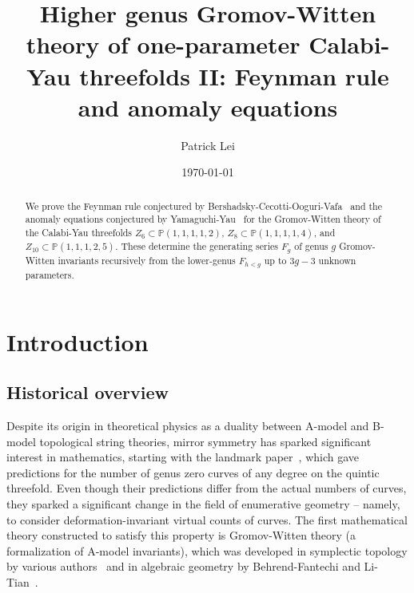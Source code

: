 \documentclass[10pt]{amsart}
\title[Feynman rule and anomaly equations for weighted $\P^4$]{Higher genus Gromov-Witten theory of one-parameter Calabi-Yau threefolds II: Feynman rule and anomaly equations}
\author{Patrick Lei}
\date{\today}
\theoremstyle{definition}
\theoremstyle{remark}
\theoremstyle{plain}
\theoremstyle{definition}
\theoremstyle{remark}
\renewcommand{\P}{\mathbb{P}}
\newcommand{\1}{\mathbf{1}}
\newcommand{\2}{\mathbf{2}}
\newcommand{\3}{\mathbf{3}}
\numberwithin{equation}{section}
\begin{document}
    
\begin{abstract}
    We prove the Feynman rule conjectured by Bershadsky-Cecotti-Ooguri-Vafa~\cite{bcov} and the anomaly equations conjectured by Yamaguchi-Yau~\cite{yy04} for the Gromov-Witten theory of the Calabi-Yau threefolds $Z_6 \subset \P(1,1,1,1,2)$, $Z_8 \subset \P(1,1,1,1,4)$, and $Z_{10} \subset \P(1,1,1,2,5)$. These determine the generating series $F_g$ of genus $g$ Gromov-Witten invariants recursively from the lower-genus $F_{h<g}$ up to $3g-3$ unknown parameters.
\end{abstract}

\maketitle

\tableofcontents

\section{Introduction}%
\label{sec:Introduction}

\subsection{Historical overview}%
\label{sub:Historical overview}

Despite its origin in theoretical physics as a duality between A-model and B-model topological string theories, mirror symmetry has sparked significant interest in mathematics, starting with the landmark paper~\cite{cdgp}, which gave predictions for the number of genus zero curves of any degree on the quintic threefold. Even though their predictions differ from the actual numbers of curves, they sparked a significant change in the field of enumerative geometry -- namely, to consider deformation-invariant virtual counts of curves. The first mathematical theory constructed to satisfy this property is Gromov-Witten theory (a formalization of A-model invariants), which was developed in symplectic topology by various authors~\cite{rtqcoh,ltsymplectic,siebertsymplecticgw,arnoldgw,ruanvirtualneighborhoods} and in algebraic geometry by Behrend-Fantechi and Li-Tian~\cite{intrinsicnc,gwalggeo,ltgwfoundation}.
\end{document}
